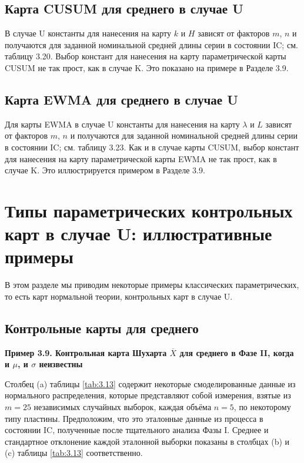 \subsection{Карта CUSUM для среднего в случае U}

В случае U константы для нанесения на карту \(k\) и \(H\) зависят от факторов \(m\), \(n\) и получаются для заданной номинальной средней длины серии в состоянии IC; см. таблицу 3.20. Выбор констант для нанесения на карту параметрической карты CUSUM не так прост, как в случае K. Это показано на примере в Разделе 3.9.

\subsection{Карта EWMA для среднего в случае U}

Для карты EWMA в случае U константы для нанесения на карту \(\lambda\) и \(L\) зависят от факторов \(m\), \(n\) и получаются для заданной номинальной средней длины серии в состоянии IC; см. таблицу 3.23. Как и в случае карты CUSUM, выбор констант для нанесения на карту параметрической карты EWMA не так прост, как в случае K. Это иллюстрируется примером в Разделе 3.9.

\section{Типы параметрических контрольных карт в случае U: иллюстративные примеры}

В этом разделе мы приводим некоторые примеры классических параметрических, то есть карт нормальной теории, контрольных карт в случае U.

\subsection{Контрольные карты для среднего}

\noindent\textbf{Пример 3.9. Контрольная карта Шухарта \(\overline{X}\) для среднего в Фазе II, когда и \(\mu\), и \(\sigma\) неизвестны}

Столбец (a) таблицы \ref{tab:3.13} содержит некоторые смоделированные данные из нормального распределения, которые представляют собой измерения, взятые из \(m = 25\) независимых случайных выборок, каждая объёма \(n = 5\), по некоторому типу пластины. Предположим, что это эталонные данные из процесса в состоянии IC, полученные после тщательного анализа Фазы I. Среднее и стандартное отклонение каждой эталонной выборки показаны в столбцах (b) и (c) таблицы \ref{tab:3.13} соответственно.

